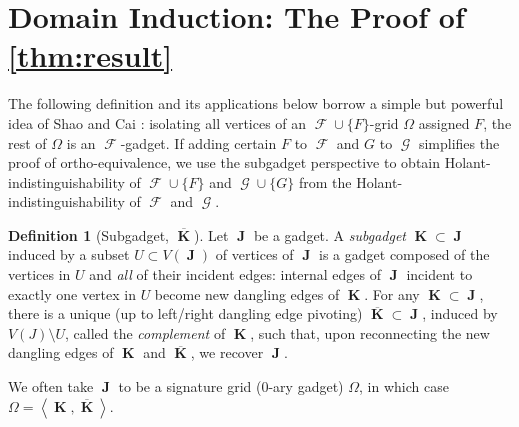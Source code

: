 \documentclass{article}
\theoremstyle{remark}
\theoremstyle{definition}
\newtheorem{definition}{Definition}[section]
\DeclareMathOperator{\vk}{\mathbf{K}}
\DeclareMathOperator{\vj}{\mathbf{J}}
\DeclareMathOperator{\fc}{\mathcal{F}}
\DeclareMathOperator{\gc}{\mathcal{G}}
\begin{document}
 \section{Domain Induction: The Proof of \autoref{thm:result}}
The following definition and its applications below borrow a simple but powerful idea of Shao and
Cai \cite[Section 8.2]{shao}: isolating all vertices of an
$\fc \cup \{F\}$-grid $\Omega$ assigned $F$, the rest of $\Omega$ is an $\fc$-gadget. 
If adding certain $F$ to $\fc$ and $G$ to $\gc$ simplifies the proof of ortho-equivalence,
we use the subgadget perspective to obtain Holant-indistinguishability of $\fc\cup\{F\}$
and $\gc\cup\{G\}$ from the Holant-indistinguishability of $\fc$ and $\gc$.
\begin{definition}[Subgadget, $\overline{\vk}$]
    Let $\vj$ be a gadget. A \emph{subgadget} $\vk \subset \vj$ induced by a subset $U \subset V(\vj)$ 
    of vertices of $\vj$ is a gadget composed of the vertices in $U$ and 
    \emph{all} of their incident edges: internal edges of $\vj$ incident to 
    exactly one vertex in $U$ become new dangling edges of $\vk$.
    For any $\vk \subset \vj$, there is a
    unique (up to left/right dangling edge pivoting) $\overline{\vk} \subset\vj$, induced by $V(J) \setminus U$, called the 
    \emph{complement} of $\vk$, such that, upon reconnecting the new dangling edges of $\vk$ and
    $\overline{\vk}$, we recover $\vj$.

    We often take $\vj$ to be a signature grid (0-ary gadget) $\Omega$, in which case
    $\Omega = \left\langle \vk,\overline{\vk} \right\rangle$.
\end{definition}
\end{document}

